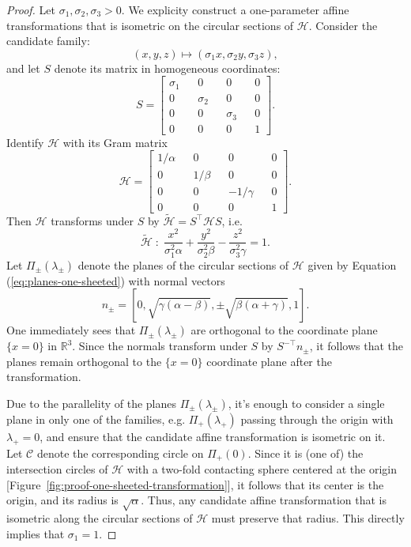 \documentclass[10pt, a4paper]{article}
\theoremstyle{BoldTopSpacing}
\theoremstyle{BoldTopSpacing}
\theoremstyle{BoldTopSpacing}
\theoremstyle{BoldTopBottomSpacing}
\theoremstyle{BoldTopSpacing}
\theoremstyle{BoldTopBottomSpacing}
\theoremstyle{remark}
\begin{document}
\begin{proof}
Let $\sigma_{1}, \sigma_{2}, \sigma_{3} > 0$. We explicity construct a one-parameter affine transformations that is isometric on the circular sections of $\mathcal{H}$. Consider the candidate family:
\begin{equation*}
\label{eq:affine-transformation-h1}
    (x, y, z) \mapsto (\sigma_{1}x, \sigma_{2}y, \sigma_{3}z),
\end{equation*}
and let $S$ denote its matrix in homogeneous coordinates:
\[
    S = \begin{bmatrix}
        \sigma_{1} && 0 && 0 && 0 \\
        0 && \sigma_{2} && 0 && 0 \\
        0 && 0 && \sigma_{3} && 0 \\
        0 && 0 && 0 && 1
    \end{bmatrix}.
\]
Identify $\mathcal{H}$ with its Gram matrix
\[
    \mathcal{H} = \begin{bmatrix}
        1 / \alpha && 0 && 0 && 0 \\
        0 && 1 / \beta && 0 && 0 \\
        0 && 0 && -1 / \gamma && 0 \\
        0 && 0 && 0 && 1
    \end{bmatrix}.
\]
Then $\mathcal{H}$ transforms under $S$ by $\tilde{\mathcal{H}} = S^{\top}\mathcal{H}S$, i.e.
\[
\tilde{\mathcal{H}} \; : \; \frac{x^2}{\sigma_{1}^2\alpha} + \frac{y^2}{\sigma_{2}^2\beta} - \frac{z^2}{\sigma_{3}^2\gamma} = 1.
\]
Let $\Pi_{\pm}(\lambda_{\pm})$ denote the planes of the circular sections of $\mathcal{H}$ given by Equation (\ref{eq:planes-one-sheeted}) with normal vectors
\[
    n_{\pm} = \left[0, \sqrt{ \gamma (\alpha- \beta) }, \pm \sqrt{\beta(\alpha+\gamma)}, 1 \right].
\]
One immediately sees that $\Pi_{\pm}(\lambda_{\pm})$ are orthogonal to the coordinate plane $\{ x = 0 \}$ in $\mathbb{R}^3$. Since the normals transform under $S$ by $S^{-\top} n_{\pm}$, it follows that the planes remain orthogonal to the $\{ x = 0 \}$ coordinate plane after the transformation. \par
Due to the parallelity of the planes $\Pi_{\pm}(\lambda_{\pm})$, it's enough to consider a single plane in only one of the families, e.g. $\Pi_{+}(\lambda_{+})$ passing through the origin with $\lambda_{+} = 0$, and ensure that the candidate affine transformation is isometric on it. Let $\mathcal{C}$ denote the corresponding circle on $\Pi_{+}(0)$. Since it is (one of) the intersection circles of $\mathcal{H}$ with a two-fold contacting sphere centered at the origin [Figure~\ref{fig:proof-one-sheeted-transformation}], it follows that its center is the origin, and its radius is $\sqrt{\alpha}$. Thus, any candidate affine transformation that is isometric along the circular sections of $\mathcal{H}$ must preserve that radius. This directly implies that $\sigma_{1} = 1$. \par

\end{proof}
\end{document}
